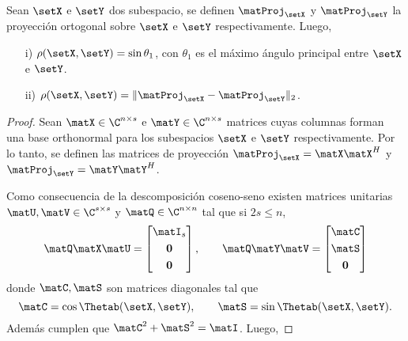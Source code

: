 	\begin{prop}\label{Prop:GapDistance}
		Sean $\setX$ e $\setY$ dos subespacio, se definen $\matProj_{\setX}$ y $\matProj_{\setY}$ la proyección ortogonal sobre $\setX$ e $\setY$ respectivamente. Luego,
		\begin{itemize}
			\item[i)] $\rho(\setX,\setY)=\sin\theta_1$, con $\theta_1$ es el máximo ángulo principal entre $\setX$ e $\setY$.
			\item[ii)] $\rho(\setX,\setY) = \|\matProj_{\setX}-\matProj_{\setY}\|_2$.
		\end{itemize} 
	\end{prop}
	\begin{proof}
        Sean  $\matX\in\C^{n\times s}$ e $\matY\in\C^{n\times s}$ matrices cuyas columnas forman una base orthonormal para los subespacios $\setX$ e $\setY$ respectivamente. Por lo tanto, se definen las matrices de proyección $\matProj_{\setX} = \matX\matX^H$ y $\matProj_{\setY} = \matY\matY^H$.
        
        Como consecuencia de la descomposición coseno-seno \cite{Stewart1990} existen matrices unitarias $\matU,\matV\in\C^{s\times s}$ y $\matQ\in\C^{n\times n}$ tal que si $2s\le n$,
            \[\matQ\matX\matU = \begin{bmatrix} \matI_s\\[0.3em] \mathbf{0}\\[0.3em]\mathbf{0}\end{bmatrix},\qquad \matQ\matY\matV = \begin{bmatrix}\matC\\[0.3em] \matS\\[0.3em] \mathbf{0}\end{bmatrix}\]
            donde $\matC, \matS$ son matrices diagonales tal que \[\matC = \cos\Thetab(\setX,\setY), \qquad \matS = \sin\Thetab(\setX, \setY).\] Además cumplen que $\matC^2+\matS^2=\matI$. Luego,


\end{proof}
